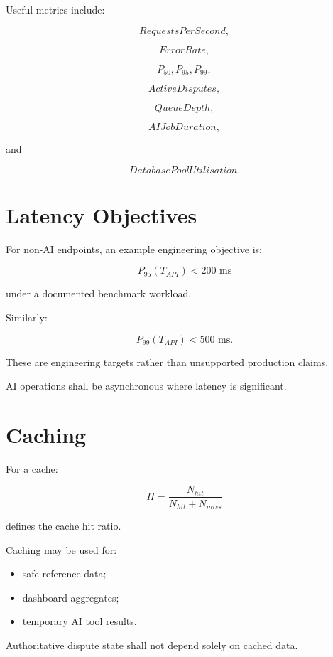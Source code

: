 \documentclass[11pt,a4paper]{article}
\begin{document}
Useful metrics include:

\[
RequestsPerSecond,
\]

\[
ErrorRate,
\]

\[
P_{50},
P_{95},
P_{99},
\]

\[
ActiveDisputes,
\]

\[
QueueDepth,
\]

\[
AIJobDuration,
\]

and

\[
DatabasePoolUtilisation.
\]

\section{Latency Objectives}

For non-AI endpoints, an example engineering objective is:

\[
P_{95}(T_{API}) < 200\text{ ms}
\]

under a documented benchmark workload.

Similarly:

\[
P_{99}(T_{API}) < 500\text{ ms}.
\]

These are engineering targets rather than unsupported production claims.

AI operations shall be asynchronous where latency is significant.

\section{Caching}

For a cache:

\[
H
=
\frac{N_{hit}}
{N_{hit}+N_{miss}}
\]

defines the cache hit ratio.

Caching may be used for:

\begin{itemize}
    \item safe reference data;
    \item dashboard aggregates;
    \item temporary AI tool results.
\end{itemize}

Authoritative dispute state shall not depend solely on cached data.
\end{document}
